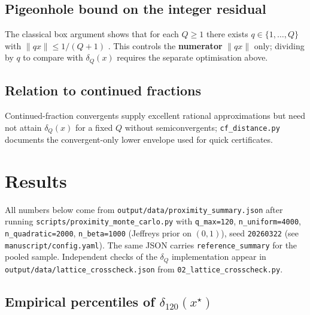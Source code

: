 \documentclass[
]{article}
\begin{document}
\subsection{Pigeonhole bound on the integer
residual}\label{pigeonhole-bound-on-the-integer-residual}

The classical box argument shows that for each \(Q \geq 1\) there exists
\(q \in \{1,\ldots,Q\}\) with \(\|qx\| \leq 1/(Q+1)\)
\citep{cassels1957}. This controls the \textbf{numerator} \(\|qx\|\)
only; dividing by \(q\) to compare with \(\delta_Q(x)\) requires the
separate optimisation above.

\subsection{Relation to continued
fractions}\label{relation-to-continued-fractions}

Continued-fraction convergents supply excellent rational approximations
but need not attain \(\delta_Q(x)\) for a fixed \(Q\) without
semiconvergents; \texttt{cf\_distance.py} documents the convergent-only
lower envelope used for quick certificates.

\newpage

\section{Results}\label{results}

All numbers below come from \texttt{output/data/proximity\_summary.json}
after running \texttt{scripts/proximity\_monte\_carlo.py} with
\texttt{q\_max=120}, \texttt{n\_uniform=4000},
\texttt{n\_quadratic=2000}, \texttt{n\_beta=1000} (Jeffreys prior on
\((0,1)\)), seed \texttt{20260322} (see
\texttt{manuscript/config.yaml}). The same JSON carries
\texttt{reference\_summary} for the pooled sample. Independent checks of
the \(\delta_Q\) implementation appear in
\texttt{output/data/lattice\_crosscheck.json} from
\texttt{02\_lattice\_crosscheck.py}.

\subsection{\texorpdfstring{Empirical percentiles of
\(\delta_{120}(x^\star)\)}{Empirical percentiles of \textbackslash delta\_\{120\}(x\^{}\textbackslash star)}}\label{empirical-percentiles-of-delta_120xstar}
\end{document}
